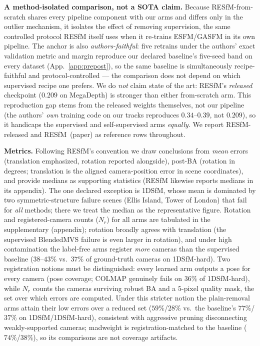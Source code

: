 \documentclass{article}
\newcommand{\mad}{madweight}
\begin{document}
\noindent\textbf{A method-isolated comparison, not a SOTA claim.} Because
RESfM-from-scratch shares every pipeline component with our arms and differs only in the
outlier mechanism, it isolates the effect of removing supervision, the same controlled
protocol RESfM itself uses when it re-trains ESFM/GASFM in its own pipeline. The anchor
is also \emph{authors-faithful}: five retrains under the authors' exact validation metric
and margin reproduce our declared baseline's five-seed band on every dataset
(App.~\ref{app:prepost}), so the same baseline is simultaneously recipe-faithful and
protocol-controlled --- the comparison does not depend on which supervised recipe one
prefers. We do
\emph{not} claim state of the art: RESfM's \emph{released} checkpoint ($0.209$ on
MegaDepth) is stronger than either from-scratch arm. This reproduction gap stems from the
released weights themselves, not our pipeline (the authors' \emph{own} training code on
our tracks reproduces $0.34$--$0.39$, not $0.209$), so it handicaps the
supervised and self-supervised arms \emph{equally}. We report RESfM-released and
RESfM~(paper) as reference rows throughout.

\noindent\textbf{Metrics.} Following RESfM's convention we draw conclusions from
\emph{mean} errors (translation emphasized, rotation reported alongside), post-BA
(rotation in degrees; translation is the aligned camera-position error in scene
coordinates), and provide medians as supporting statistics (RESfM likewise reports
medians in its appendix). The one declared exception is 1DSfM, whose mean is dominated by
two symmetric-structure failure scenes (Ellis Island, Tower of London) that fail for
\emph{all} methods; there we treat the median as the representative figure. Rotation and
registered-camera counts ($N_r$) for all arms are tabulated in the supplementary
(appendix); rotation broadly agrees with translation (the supervised BlendedMVS failure
is even larger in rotation), and under high contamination the label-free arms register
\emph{more} cameras than the supervised baseline ($38$--$43\%$ vs.\ $37\%$ of
ground-truth cameras on 1DSfM-hard). Two registration notions must be distinguished:
every learned arm outputs a pose for every camera (pose coverage; COLMAP genuinely fails
on $36\%$ of 1DSfM-hard), while $N_r$ counts the cameras surviving robust BA and a
$5$-pixel quality mask, the set over which errors are computed. Under this stricter
notion the plain-removal arms attain their low errors over a reduced set ($59\%$/$28\%$
vs.\ the baseline's $77\%$/$37\%$ on 1DSfM/1DSfM-hard), consistent with aggressive
pruning disconnecting weakly-supported cameras; \mad{} is registration-matched to the
baseline ($74\%$/$38\%$), so its comparisons are not coverage artifacts.
\end{document}
